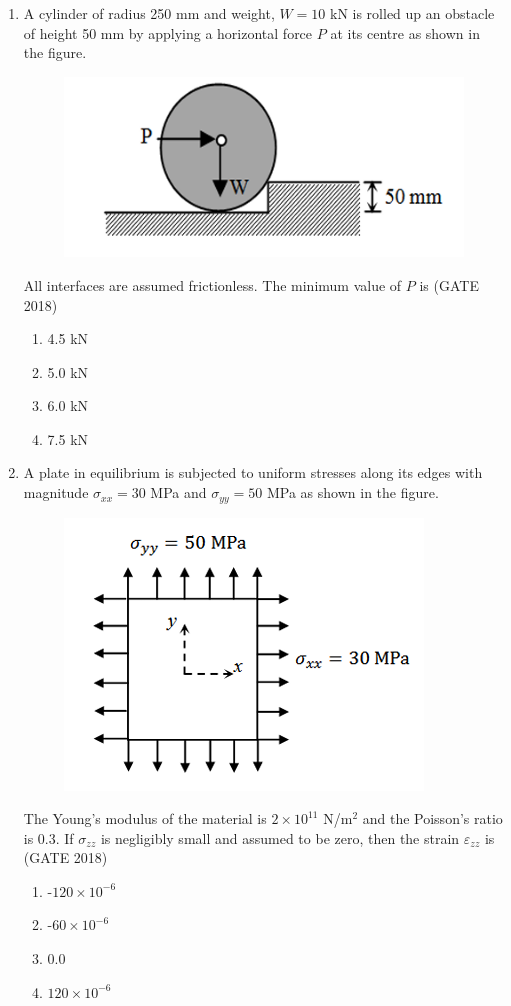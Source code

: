 \documentclass[journal,12pt,onecolumn]{IEEEtran}
\theoremstyle{remark}
\begin{document}
\begin{enumerate}
\item A cylinder of radius 250 mm and weight, $W = 10$ kN is rolled up an obstacle of height 50 mm by applying a horizontal force $P$ at its centre as shown in the figure.
\begin{figure}[h]
    \centering
    \includegraphics[width=0.5\linewidth]{GATE-CE-2018/28-1.png}
    \caption{}
    \label{28-1}
\end{figure}
All interfaces are assumed frictionless. The minimum value of $P$ is
\hfill{(GATE 2018)}
\begin{multicols}{4}
\begin{enumerate}
    \item 4.5 kN
    \item 5.0 kN
    \item 6.0 kN
    \item 7.5 kN
\end{enumerate}
\end{multicols}
\vspace{1cm}
\newpage
\item A plate in equilibrium is subjected to uniform stresses along its edges with magnitude $\sigma_{xx}=30$ MPa and $\sigma_{yy}=50$ MPa as shown in the figure.
\begin{figure}[h]
    \centering
    \includegraphics[width=0.5\linewidth]{GATE-CE-2018/29-1.png}
    \caption{}
    \label{29-1}
\end{figure}
The Young's modulus of the material is $2\times10^{11}$ N/m$^2$ and the Poisson's ratio is 0.3. If $\sigma_{zz}$ is negligibly small and assumed to be zero, then the strain $\varepsilon_{zz}$ is
\hfill{(GATE 2018)}
\begin{multicols}{4}
\begin{enumerate}
    \item -$120\times10^{-6}$
    \item -$60\times10^{-6}$
    \item $0.0$
    \item $120\times10^{-6}$
\end{enumerate}
\end{multicols}
\vspace{1cm}


\end{enumerate}
\end{document}
